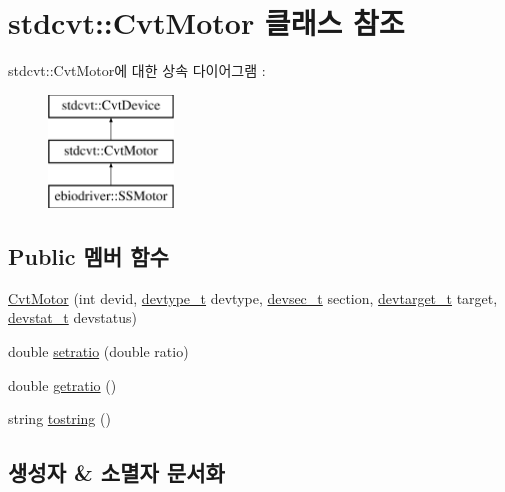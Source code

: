 \hypertarget{classstdcvt_1_1CvtMotor}{}\section{stdcvt\+:\+:Cvt\+Motor 클래스 참조}
\label{classstdcvt_1_1CvtMotor}
stdcvt\+:\+:Cvt\+Motor에 대한 상속 다이어그램 \+: \begin{figure}[H]
\begin{center}
\leavevmode
\includegraphics[height=3.000000cm]{classstdcvt_1_1CvtMotor}
\end{center}
\end{figure}
\subsection*{Public 멤버 함수}
\begin{DoxyCompactItemize}
\item 
\hyperlink{classstdcvt_1_1CvtMotor_a5cb552a64668bfbb21d4cd89dd304b6d}{Cvt\+Motor} (int devid, \hyperlink{cvtcode_8h_ae8e34073e35cef0bb47c7fa535fc638b}{devtype\+\_\+t} devtype, \hyperlink{cvtcode_8h_a268eebb73363e24b9e65fd51973bd9c0}{devsec\+\_\+t} section, \hyperlink{cvtcode_8h_a2b37fd5cc4d40c0b8c4b987c271e5ceb}{devtarget\+\_\+t} target, \hyperlink{cvtcode_8h_ad21cd565f839adc5b19a0993e7da7278}{devstat\+\_\+t} devstatus)
\item 
double \hyperlink{classstdcvt_1_1CvtMotor_a5b6c4495daf5aa13b580d9a574c7e866}{setratio} (double ratio)
\item 
double \hyperlink{classstdcvt_1_1CvtMotor_aa6155ea9cba5a0797ce9baa08139c553}{getratio} ()
\item 
string \hyperlink{classstdcvt_1_1CvtMotor_a93295bdf3c61854878f663fad712adaa}{tostring} ()
\end{DoxyCompactItemize}


\subsection{생성자 \& 소멸자 문서화}
